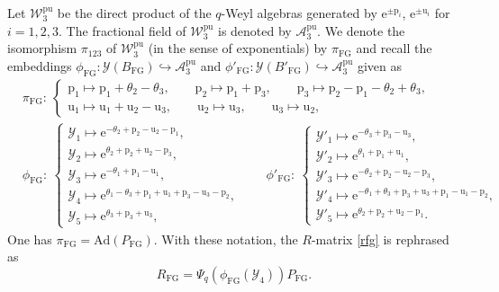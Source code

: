 \documentclass[pdftex]{sigma}
\newcommand{\e}{{\mathrm e}}
\numberwithin{equation}{section}
\begin{document}
Let $\mathcal{W}^{\mathrm{pu}}_3$ be the direct product of the
$q$-Weyl algebras generated by $\e^{\pm \mathrm{p}_i}$,
$\e^{\pm \mathrm{u}_i}$ for $i=1, 2, 3$. The fractional field of
$\mathcal{W}^{\mathrm{pu}}_3$ is denoted by
$\mathcal{A}^{\mathrm{pu}}_3$. We denote the isomorphism $\pi_{123}$
of $\mathcal{W}^{\mathrm{pu}}_3$ \cite[equation~(3.7)]{IKT1} (in the sense
of exponentials) by $\pi_\mathrm{FG}$ and recall the embeddings
$\phi_\mathrm{FG}\colon \mathcal{Y}(B_\mathrm{FG}) \hookrightarrow
\mathcal{A}^{\mathrm{pu}}_3$ and
$\phi'_\mathrm{FG}\colon \mathcal{Y}(B'_\mathrm{FG}) \hookrightarrow
\mathcal{A}^{\mathrm{pu}}_3$ \cite[equation~(3.6)]{IKT1} given as
\begin{align*}%
&\pi_\mathrm{FG}\colon\
\begin{cases}
\mathrm{p}_1 \mapsto \mathrm{p}_1+ \theta_2-\theta_3,
\qquad
\mathrm{p}_2 \mapsto \mathrm{p}_1+\mathrm{p}_3,
\qquad
\mathrm{p}_3 \mapsto \mathrm{p}_2-\mathrm{p}_1- \theta_2+\theta_3,
\\
\mathrm{u}_1 \mapsto \mathrm{u}_1+\mathrm{u}_2-\mathrm{u}_3,
\qquad
\mathrm{u}_2 \mapsto \mathrm{u}_3,
\qquad
\mathrm{u}_3 \mapsto \mathrm{u}_2,
\end{cases}
\\
&\phi_\mathrm{FG}\colon\
\begin{cases}
\mathscr{Y}_1 \mapsto \e^{-\theta_2+\mathrm{p}_2-\mathrm{u}_2-\mathrm{p}_1},
\\
\mathscr{Y}_2 \mapsto \e^{\theta_2+\mathrm{p}_2+\mathrm{u}_2-\mathrm{p}_3},
\\
\mathscr{Y}_3 \mapsto \e^{-\theta_1+\mathrm{p}_1-\mathrm{u}_1},
\\
\mathscr{Y}_4 \mapsto \e^{\theta_1-\theta_3+\mathrm{p}_1
+\mathrm{u}_1+\mathrm{p}_3-\mathrm{u}_3-\mathrm{p}_2},
\\
\mathscr{Y}_5 \mapsto \e^{\theta_3+\mathrm{p}_3+\mathrm{u}_3},
\end{cases}
\qquad
\phi'_\mathrm{FG}\colon\
\begin{cases}
\mathscr{Y}'_1 \mapsto \e^{-\theta_3 +\mathrm{p}_3-\mathrm{u}_3},
\\
\mathscr{Y}'_2 \mapsto \e^{\theta_1+\mathrm{p}_1+\mathrm{u}_1},
\\
\mathscr{Y}'_3 \mapsto \e^{-\theta_2+\mathrm{p}_2-\mathrm{u}_2-\mathrm{p}_3},
\\
\mathscr{Y}'_4 \mapsto \e^{-\theta_1+\theta_3+\mathrm{p}_3
+\mathrm{u}_3+\mathrm{p}_1-\mathrm{u}_1-\mathrm{p}_2},
\\
\mathscr{Y}'_5 \mapsto \e^{\theta_2+\mathrm{p}_2+\mathrm{u}_2-\mathrm{p}_1}.
\end{cases}
\end{align*}
One has $\pi_\mathrm{FG} = \mathrm{Ad}(P_\mathrm{FG})$.
With these notation, the $R$-matrix \eqref{rfg} is rephrased as
\[%
R_\mathrm{FG} =
\Psi_q(\phi_\mathrm{FG}(\mathscr{Y}_4))P_\mathrm{FG}.
\]
\end{document}
